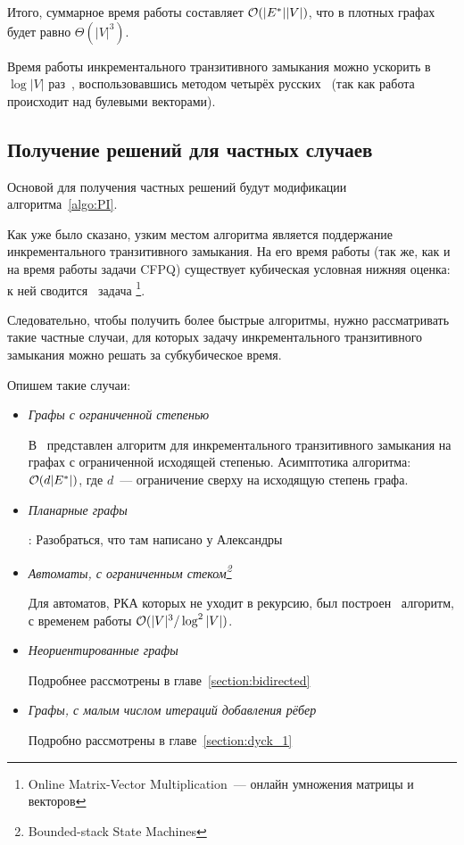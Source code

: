 Итого, суммарное время работы составляет $\mathcal{O}(|E^{*}||V|)$, что в плотных графах будет равно $\Theta(|V|^3)$. 

\begin{note}
  Время работы инкрементального транзитивного замыкания можно ускорить в $\log |V|$ раз~\cite{Shemetova21}, воспользовавшись методом четырёх русских~\cite{Arlazarov70} (так как работа происходит над булевыми векторами).
\end{note}

\subsection{Получение решений для частных случаев}

Основой для получения частных решений будут модификации алгоритма~\ref{algo:PI}.

Как уже было сказано, узким местом алгоритма является поддержание инкрементального транзитивного замыкания. На его время работы (так же, как и на время работы задачи CFPQ) существует кубическая условная нижняя оценка: к ней сводится~\cite{Henzinger15} задача \footnote{Online Matrix-Vector Multiplication~--- онлайн умножения матрицы и векторов}. 

Следовательно, чтобы получить более быстрые алгоритмы, нужно рассматривать такие частные случаи, для которых задачу инкрементального транзитивного замыкания можно решать за субкубическое время.

Опишем такие случаи:

\begin{itemize}
  \item \textit{Графы с ограниченной степенью}

    В~\cite{Yellin1993} представлен алгоритм для инкрементального транзитивного замыкания на графах с ограниченной исходящей степенью. Асимптотика алгоритма: $\mathcal{O}(d |E^{*}|)$, где $d$~--- ограничение сверху на исходящую степень графа.

  \item \textit{Планарные графы}

    \TODO: Разобраться, что там написано у Александры 
  
  \item \textit{Автоматы, с ограниченным стеком\footnote{Bounded-stack State Machines}~\cite{Chaudhuri08}}

    Для автоматов, РКА которых не уходит в рекурсию, был построен~\cite{Chaudhuri08} алгоритм, с временем работы $\mathcal{O}(|V|^3 / \log^2 |V|)$.

  \item \textit{Неориентированные графы}

    Подробнее рассмотрены в главе~\ref{section:bidirected}

  \item \textit{Графы, с малым числом итераций добавления рёбер}
    
    Подробно рассмотрены в главе~\ref{section:dyck_1}

\end{itemize}

